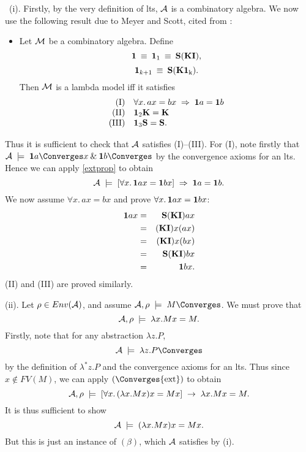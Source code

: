 {\proof\ (i). Firstly, by the very definition of lts, ${\cal A}$ is a combinatory algebra. We now use the following result due to Meyer and Scott, cited from \cite[Theorem 5.6.3, p.\ 117]{Bar}:
\begin{itemize}
\item Let ${\cal M}$ be a combinatory algebra. Define
\[ {\bf 1} \: \equiv \: {\bf 1}_{1} \: \equiv \: {\bf S(KI)}, \]
\[ {\bf 1}_{k+1} \: \equiv \: {\bf S(K} {\bf 1}_{{\rm k}}) . \]
Then ${\cal M}$ is a lambda model iff it satisfies
\[ \begin{array}{rl}
\mbox{(I)} & \forall x . \, a x = b x \; \Rightarrow \; {\bf 1} a = {\bf 1} b \\
\mbox{(II)} & {\bf 1}_{2} {\bf K} = {\bf K} \\
\mbox{(III)} & {\bf 1}_{3} {\bf S} = {\bf S} .
\end{array} \]
\end{itemize}
Thus it is sufficient to check that ${\cal A}$ satisfies (I)--(III). 
For (I), note firstly that ${\cal A} \; \models \; {\bf 1} a 
\Converges 
x \: \& \: {\bf 1} b \Converges$ by the convergence axioms for an lts. Hence we can apply \ref{extprop} to obtain
\[ {\cal A} \; \models \; [\forall x . \, {\bf 1} a x = {\bf 1} b x] \; \Rightarrow \; {\bf 1} a = {\bf 1} b . \]
We now assume $\forall x . \, a x =  b x$ and prove $\forall x . \, {\bf 1} a x = {\bf 1} b x$:
\begin{eqnarray*}
{\bf 1} a x & = & {\bf S(KI)} a x \\
& = & {\bf (KI)} x (a x) \\
& = & {\bf (KI)} x (b x) \\
& = & {\bf S (KI)} b x \\
& = & {\bf 1} b x .
\end{eqnarray*}
(II) and (III) are proved similarly.

\noindent (ii). Let $\rho \in Env({\cal A})$, and assume ${\cal A}, \rho \; \models \; M \Converges$. We must prove that
\[ {\cal A}, \rho \; \models \; \lambda x . M x = M . \]
Firstly, note that for any abstraction $\lambda z . P$,
\[ {\cal A} \; \models \; \lambda z . P \Converges \]
by the definition of $\lambda^{\ast} z . P$ and the convergence axioms for an lts. Thus since $x \not\in FV(M)$, we can apply $(\Converges {\rm ext})$ to obtain
\[ {\cal A}, \rho \; \models \; [ \forall x . \, (\lambda x . M x) x = M x ] \; \rightarrow \; \lambda x . M x = M . \]
It is thus sufficient to show
\[ {\cal A} \; \models \; (\lambda x . M x) x = M x . \]
But this is just an instance of $(\beta )$, which ${\cal A}$ satisfies by (i).

}
